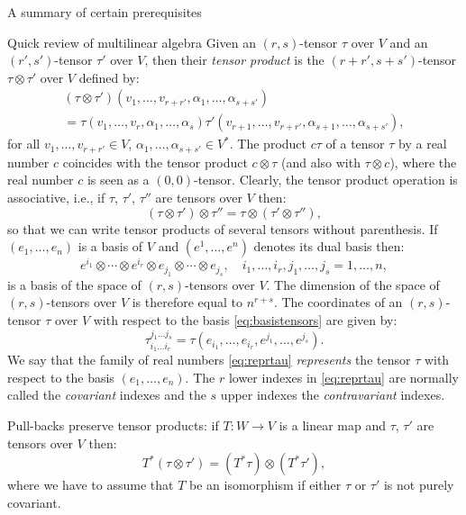 \documentclass[oneside,a4paper,11pt]{amsbook}
\theoremstyle{remark}\newtheorem{exercise}{Exercise}[chapter]
\theoremstyle{plain}\newtheorem{teo}{Theorem}[section]
\theoremstyle{plain}\newtheorem{lem}[teo]{Lemma}
\theoremstyle{plain}\newtheorem{prop}[teo]{Proposition}
\theoremstyle{plain}\newtheorem{cor}[teo]{Corollary}
\theoremstyle{definition}\newtheorem{defin}[teo]{Definition}
\theoremstyle{remark}\newtheorem{rem}[teo]{Remark}
\theoremstyle{definition}\newtheorem{notation}[teo]{Notation}
\theoremstyle{definition}\newtheorem{convention}[teo]{Convention}
\theoremstyle{definition}\newtheorem{example}[teo]{Example}
\numberwithin{section}{chapter}
\numberwithin{equation}{section}
\begin{document}
\begin{chapter}{A summary of certain prerequisites}
\begin{section}{Quick review of multilinear algebra}
Given an $(r,s)$-tensor $\tau$ over $V$ and
an $(r',s')$-tensor $\tau'$ over $V$, then their {\em tensor product\/}
is the $(r+r',s+s')$-tensor $\tau\otimes\tau'$ over $V$ defined by:
\begin{multline*}
(\tau\otimes\tau')(v_1,\ldots,v_{r+r'},\alpha_1,\ldots,\alpha_{s+s'})\\
=\tau(v_1,\ldots,v_r,\alpha_1,\ldots,\alpha_s)\tau'(v_{r+1},\ldots,v_{r+r'},\alpha_{s+1},\ldots,\alpha_{s+s'}),
\end{multline*}
for all $v_1,\ldots,v_{r+r'}\in V$, $\alpha_1,\ldots,\alpha_{s+s'}\in V^*$. The product $c\tau$ of a tensor $\tau$ by a real number $c$
coincides with the tensor product $c\otimes\tau$ (and also with $\tau\otimes c$), where the real number $c$ is seen as a $(0,0)$-tensor.
Clearly, the tensor product operation is associative, i.e., if $\tau$, $\tau'$, $\tau''$ are tensors over $V$ then:
\[(\tau\otimes\tau')\otimes\tau''=\tau\otimes(\tau'\otimes\tau''),\]
so that we can write tensor products of several tensors without parenthesis.
If $(e_1,\ldots,e_n)$ is a basis of $V$ and $(e^1,\ldots,e^n)$ denotes its dual basis then:
\begin{equation}\label{eq:basistensors}
e^{i_1}\otimes\cdots\otimes e^{i_r}\otimes e_{j_1}\otimes\cdots\otimes e_{j_s},\quad i_1,\ldots,i_r,j_1,\ldots,j_s=1,\ldots,n,
\end{equation}
is a basis of the space of $(r,s)$-tensors over $V$. The dimension of the space of $(r,s)$-tensors over $V$ is therefore equal to $n^{r+s}$.
The coordinates of an $(r,s)$-tensor $\tau$ over $V$ with respect to the basis \eqref{eq:basistensors} are given by:
\begin{equation}\label{eq:reprtau}
\tau_{i_1\ldots i_r}^{j_1\ldots j_s}=\tau(e_{i_1},\ldots,e_{i_r},e^{j_1},\ldots,e^{j_s}).
\end{equation}
We say that the family of real numbers \eqref{eq:reprtau} {\em represents\/} the tensor $\tau$ with respect to the basis $(e_1,\ldots,e_n)$.
The $r$ lower indexes in \eqref{eq:reprtau} are normally called the {\em covariant\/} indexes and the $s$ upper indexes the
{\em contravariant\/} indexes.

Pull-backs preserve tensor products: if $T:W\to V$ is a linear map and $\tau$, $\tau'$ are tensors over $V$ then:
\begin{equation}\label{eq:Tstarthomo}
T^*(\tau\otimes\tau')=(T^*\tau)\otimes(T^*\tau'),
\end{equation}
where we have to assume that $T$ be an isomorphism if either $\tau$ or $\tau'$ is not purely covariant.


\end{section}
\end{chapter}
\end{document}
